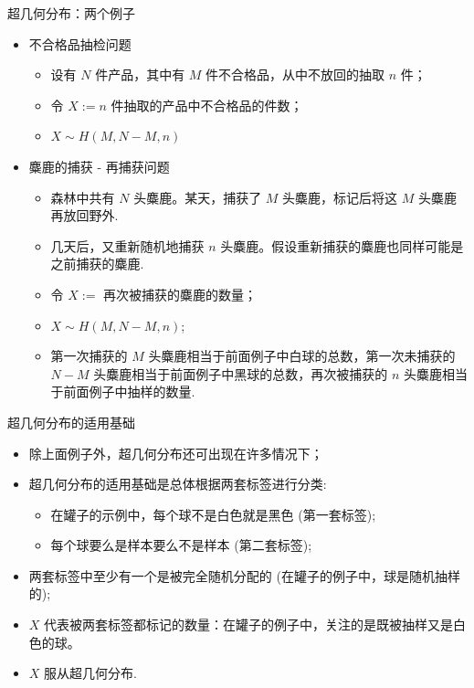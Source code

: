 \documentclass[Prob-All.tex]{subfiles}
\begin{document}
\begin{frame}{超几何分布：两个例子}
	\begin{itemize}[<+-|alert@+>]
		\item 不合格品抽检问题
		      \begin{itemize}[<+-|alert@+>]
			      \item 设有 $N$ 件产品，其中有 $M$ 件不合格品，从中不放回的抽取 $n$ 件；
			      \item 令 $X:=n$ 件抽取的产品中不合格品的件数；
			      \item $X\sim H(M,N-M,n)$
		      \end{itemize}
		\item 麋鹿的捕获 - 再捕获问题
		      \begin{itemize}[<+-|alert@+>]
			      \item 森林中共有 $N$ 头麋鹿。某天，捕获了 $M$ 头麋鹿，标记后将这 $M$ 头麋鹿再放回野外.
			      \item 几天后，又重新随机地捕获 $n$ 头麋鹿。假设重新捕获的麋鹿也同样可能是之前捕获的麋鹿.
			      \item 令 $X:=$ 再次被捕获的麋鹿的数量；
			      \item $X\sim H(M,N-M,n)$;
			      \item 第一次捕获的 $M$ 头麋鹿相当于前面例子中白球的总数，第一次未捕获的 $N-M$ 头麋鹿相当于前面例子中黑球的总数，再次被捕获的 $n$ 头麋鹿相当于前面例子中抽样的数量.
		      \end{itemize}
	\end{itemize}
\end{frame}




\begin{frame}{超几何分布的适用基础}
	\begin{itemize}[<+-|alert@+>]
		\item 除上面例子外，超几何分布还可出现在许多情况下；
		\item 超几何分布的适用基础是总体根据两套标签进行分类:
		      \begin{itemize}[<+-|alert@+>]
			      \item 在罐子的示例中，每个球不是白色就是黑色 (第一套标签);
			      \item 每个球要么是样本要么不是样本 (第二套标签);
		      \end{itemize}
		\item 两套标签中至少有一个是被完全随机分配的 (在罐子的例子中，球是随机抽样的);
		\item $X$ 代表被两套标签都标记的数量：在罐子的例子中，关注的是既被抽样又是白色的球。
		\item $X$ 服从超几何分布.
	\end{itemize}
\end{frame}
\end{document}

